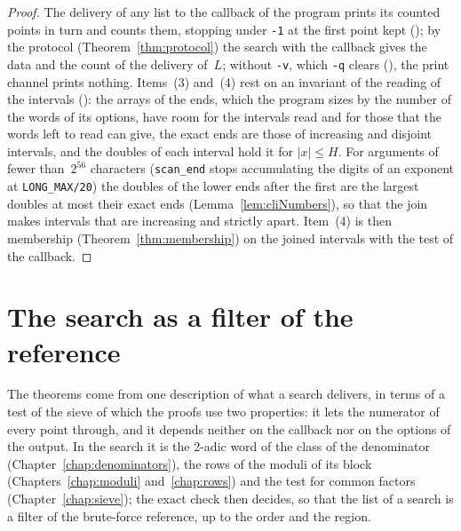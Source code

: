 \begin{proof}
  \leanok
  The delivery of any list to the callback of the program prints its counted points in turn and
  counts them, stopping under \verb|-1| at the first point kept
  (); by the protocol (Theorem~\ref{thm:protocol}) the search
  with the callback gives the data and the count of the delivery of~$L$; without \verb|-v|, which
  \verb|-q| clears (), the print channel
  prints nothing. Items~(3) and~(4) rest on an invariant of the reading of the intervals
  (): the arrays of the ends, which the program sizes by the
  number of the words of its options, have room for the intervals read and for those that the words
  left to read can give, the exact ends are those of increasing and disjoint
  intervals, and the doubles of each interval hold it for $|x| \le H$. For arguments of fewer
  than~$2^{56}$ characters (\verb|scan_end| stops accumulating the digits of an exponent at
  \verb|LONG_MAX/20|) the doubles of the lower ends after the first are the largest doubles at most
  their exact ends (Lemma~\ref{lem:cliNumbers}), so that the join makes intervals that are
  increasing and strictly apart. Item~(4) is then membership (Theorem~\ref{thm:membership}) on the
  joined intervals with the test of the callback.
\end{proof}

\section{The search as a filter of the reference}\label{sec:theoremsProofs}

The theorems come from one description of what a search delivers, in terms of a test of the sieve of
which the proofs use two properties: it lets the numerator of every point through, and it depends
neither on the callback nor on the options of the output. In the search it is the 2-adic word of the
class of the denominator (Chapter~\ref{chap:denominators}), the rows of the moduli of its block
(Chapters~\ref{chap:moduli} and~\ref{chap:rows}) and the test for common factors
(Chapter~\ref{chap:sieve}); the exact check then decides, so that the list of a search is a filter
of the brute-force reference, up to the order and the region.

